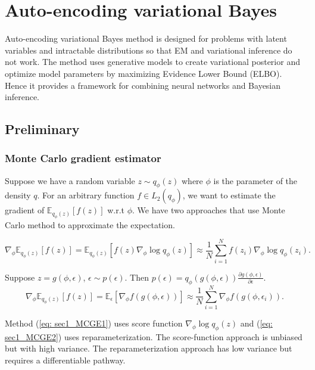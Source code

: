 \section{Auto-encoding variational Bayes}

Auto-encoding variational Bayes method \cite{kingma2022autoencodingvariationalbayes} is designed for problems with latent variables and intractable distributions so that 
EM and variational inference do not work. 
The method uses generative models to create variational posterior and optimize model parameters by maximizing Evidence Lower Bound (ELBO). 
Hence it provides a framework for combining neural networks and Bayesian inference. 

\subsection{Preliminary}
\subsubsection{Monte Carlo gradient estimator }

Suppose we have a random variable $z\sim q_{\phi}(z)$ where $\phi$ is the parameter of the density $q$. 
For an arbitrary function $f\in L_2(q_{\phi})$, 
we want to estimate the gradient of $\mathbb{E}_{q_{\phi}(z)}[f(z)]$ w.r.t $\phi$. 
We have two approaches that use Monte Carlo method to approximate the expectation. 

\begin{equation}
    \label{eq: sec1_MCGE1}
    \nabla_{\phi}\mathbb{E}_{q_{\phi}(z)}[f(z)] = \mathbb{E}_{q_{\phi}(z)}[f(z)\nabla_{\phi}\log q_{\phi}(z)]\approx \frac{1}{N}\sum_{i=1}^{N}f(z_i)\nabla_{\phi}\log q_{\phi}(z_i).
\end{equation}

Suppose $z = g(\phi,\epsilon)$, $\epsilon\sim p(\epsilon)$. Then $p(\epsilon)=q_{\phi}(g(\phi,\epsilon))\frac{\partial g(\phi,\epsilon)}{\partial \epsilon}$. 
\begin{equation}
    \label{eq: sec1_MCGE2}
    \nabla_{\phi}\mathbb{E}_{q_{\phi}(z)}[f(z)] = \mathbb{E}_{\epsilon}[\nabla_{\phi}f(g(\phi,\epsilon))] \approx \frac{1}{N}\sum_{i=1}^{N}\nabla_{\phi}f(g(\phi,\epsilon_i)).
\end{equation}

Method (\ref{eq: sec1_MCGE1}) uses score function $\nabla_{\phi}\log q_{\phi}(z)$ and (\ref{eq: sec1_MCGE2}) uses reparameterization. 
The score-function approach is unbiased but with high variance. 
The reparameterization approach has low variance but requires a differentiable pathway. 


